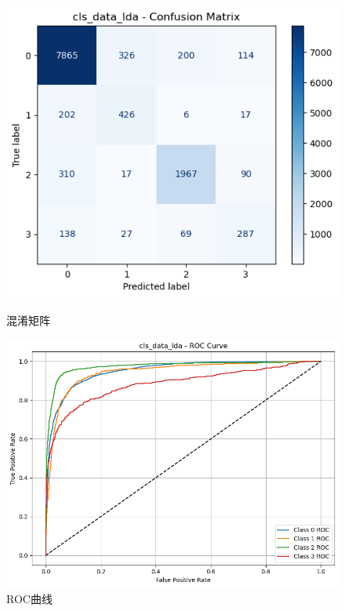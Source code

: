\documentclass[10pt]{article}
\begin{document}
\begin{figure}[H]
\centering
\begin{minipage}[t]{0.45\textwidth}
  \centering
  \includegraphics[width=\linewidth]{cls_lda_lda1.png}
  \caption{混淆矩阵}
  \label{fig:47}
\end{minipage}
\hfill
\begin{minipage}[t]{0.52\textwidth}
  \centering
  \includegraphics[width=\linewidth]{cls_lda_lda2.png}
  \caption{ROC曲线}
  \label{fig:48}
\end{minipage}
\end{figure}
\end{document}
